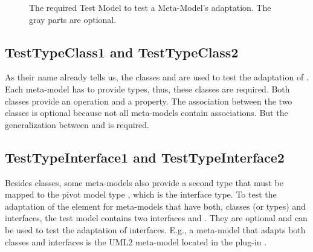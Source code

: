 \begin{figure}[!p]
	\centering
	\caption{The required Test Model to test a Meta-Model's adaptation. The gray parts are optional.}
	\label{pic:metaModelTestsuite:testModel}
\end{figure}


\subsection{TestTypeClass1 and TestTypeClass2}

As their name already tells us, the classes  and  are used to test the adaptation of . Each meta-model has to provide types, thus, these classes are required. Both classes provide an operation and a property. The association between the two classes is optional because not all meta-models contain associations. But the generalization between  and  is required.


\subsection{TestTypeInterface1 and TestTypeInterface2}

Besides classes, some meta-models also provide a second type that must be mapped to the pivot model type , which is the interface type. To test the adaptation of the  element for meta-models that have both, classes (or types) and interfaces, the test model contains two interfaces  and . They are optional and can be used to test the adaptation of interfaces. E.g., a meta-model that adapts both classes and interfaces is the \acs{UML}2 meta-model located in the plug-in .


